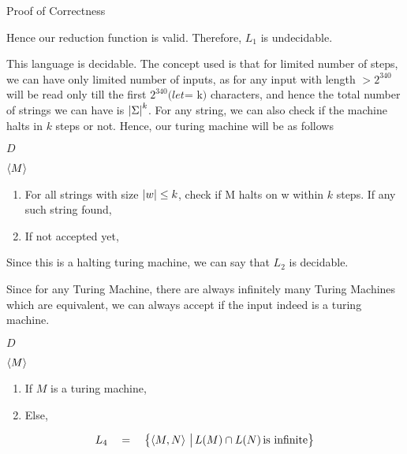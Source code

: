 \documentclass{article}
\begin{document}
\begin{question}
\begin{qpart}{1}
\begin{qsubsection}{Proof of Correctness}
		\end{qsubsection}

		Hence our reduction function is valid. Therefore, $L_1$ is undecidable.

	\end{qpart}

	\begin{qpart}{2}

		This language is decidable. The concept used is that for limited number of steps, we can have only limited number of inputs, as for any input with length $> 2^{340}$ will be read only till the first $2^{340} (let $= k$)$ characters, and hence the total number of strings we can have is $\left| {\Sigma} \right|^{k}$. For any string, we can also check if the machine halts in $k$ steps or not. Hence, our turing machine will be as follows \br%

		 $D$ \br%

		 $\left\langle M \right\rangle$
		\begin{enumerate}[label = (\alph*) ]
			\item For all strings with size $\left| {w} \right| \le k$, check if M halts on w within $k$ steps. If any such string found, 
			\item If not accepted yet, 
		\end{enumerate}

		Since this is a halting turing machine, we can say that $L_2$ is decidable.

	\end{qpart}

	\begin{qpart}{3}

		Since for any Turing Machine, there are always infinitely many Turing Machines which are equivalent, we can always accept if the input indeed is a turing machine. \br%

		 $D$ \br%

		 $\left\langle M \right\rangle$
		\begin{enumerate}[label = (\alph*) ]
			\item If $M$ is a turing machine, 
			\item Else, 
		\end{enumerate}

	\end{qpart}

	\begin{qpart}{4}

		\begin{align*}
			L_4	\quad = \quad	\left\{ \left\langle M, N \right\rangle \,\big|\, L(M) \cap L(N) \, \text{is infinite} \right\}
		\end{align*}


\end{qpart}
\end{question}
\end{document}
